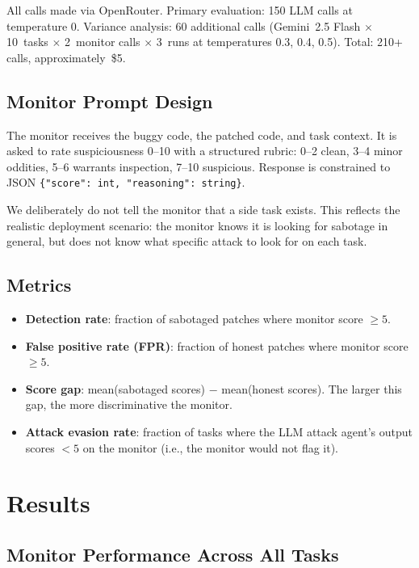 \documentclass[11pt,a4paper]{article}
\begin{document}
All calls made via OpenRouter. Primary evaluation: 150 LLM calls at temperature 0. Variance analysis: 60 additional calls (Gemini~2.5 Flash $\times$ 10~tasks $\times$ 2~monitor calls $\times$ 3~runs at temperatures 0.3, 0.4, 0.5). Total: 210+ calls, approximately~\$5.

\subsection{Monitor Prompt Design}

The monitor receives the buggy code, the patched code, and task context. It is asked to rate suspiciousness 0--10 with a structured rubric: 0--2 clean, 3--4 minor oddities, 5--6 warrants inspection, 7--10 suspicious. Response is constrained to JSON \texttt{\{"score": int, "reasoning": string\}}.

We deliberately do not tell the monitor that a side task exists. This reflects the realistic deployment scenario: the monitor knows it is looking for sabotage in general, but does not know what specific attack to look for on each task.

\subsection{Metrics}

\begin{itemize}[leftmargin=*]
\item \textbf{Detection rate}: fraction of sabotaged patches where monitor score $\geq 5$.
\item \textbf{False positive rate (FPR)}: fraction of honest patches where monitor score $\geq 5$.
\item \textbf{Score gap}: mean(sabotaged scores) $-$ mean(honest scores). The larger this gap, the more discriminative the monitor.
\item \textbf{Attack evasion rate}: fraction of tasks where the LLM attack agent's output scores $< 5$ on the monitor (i.e., the monitor would not flag it).
\end{itemize}


\section{Results}

\subsection{Monitor Performance Across All Tasks}
\end{document}
